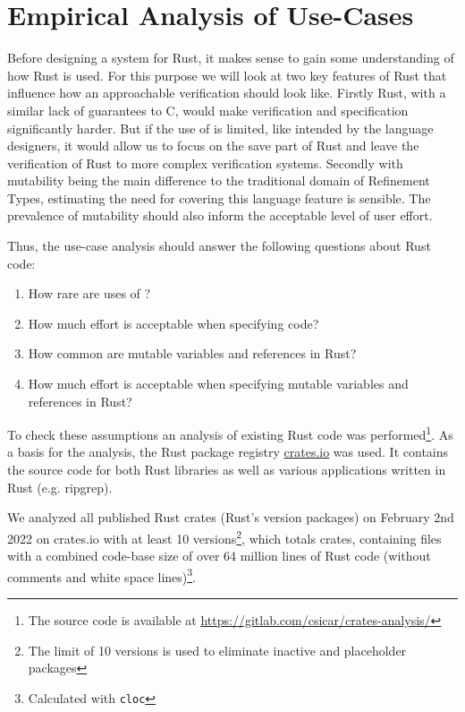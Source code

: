 \documentclass[twoside, english, final]{sdqthesis}
\theoremstyle{definition}
\begin{document}
\chapter{Empirical Analysis of Use-Cases} \label{ch:analysis} 

Before designing a system for Rust, it makes sense to gain some understanding of how Rust is used. For this purpose we will look at two key features of Rust that influence how an approachable verification should look like.
Firstly  Rust, with a similar lack of guarantees to C, would make verification and specification significantly harder. But if the use of  is limited, like intended by the language designers, it would allow us to focus on the save part of Rust and leave the verification of  Rust to more complex verification systems.
Secondly with mutability being the main difference to the traditional domain of Refinement Types, estimating the need for covering this language feature is sensible. The prevalence of mutability should also inform the acceptable level of user effort.

Thus, the use-case analysis should answer the following questions about Rust code:
\begin{enumerate}
  \item How rare are uses of ?
  \item How much effort is acceptable when specifying  code?
  \item How common are mutable variables and references in Rust?
  \item How much effort is acceptable when specifying mutable variables and references in Rust?
\end{enumerate}

To check these assumptions an analysis of existing Rust code was performed\footnote{The source code is available at \url{https://gitlab.com/csicar/crates-analysis/}}. As a basis for the analysis, the Rust package registry \href{https://www.crates.io}{crates.io} was used. It contains the source code for both Rust libraries as well as various applications written in Rust (e.g. ripgrep). 

We analyzed all published Rust crates (Rust's version packages) on February 2nd 2022 on crates.io with at least 10 versions\footnote{The limit of 10 versions is used to eliminate inactive and placeholder packages}, which totals  crates, containing  files with a combined code-base size of over 64 million lines of Rust code (without comments and white space lines)\footnote{Calculated with \texttt{cloc}}. 
\end{document}
